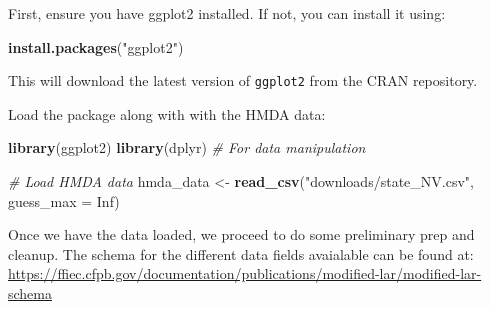 \documentclass[
]{book}
\newenvironment{Shaded}{\begin{snugshade}}{\end{snugshade}}
\newcommand{\AttributeTok}[1]{\textcolor[rgb]{0.13,0.29,0.53}{#1}}
\newcommand{\CommentTok}[1]{\textcolor[rgb]{0.56,0.35,0.01}{\textit{#1}}}
\newcommand{\ConstantTok}[1]{\textcolor[rgb]{0.56,0.35,0.01}{#1}}
\newcommand{\FunctionTok}[1]{\textcolor[rgb]{0.13,0.29,0.53}{\textbf{#1}}}
\newcommand{\NormalTok}[1]{#1}
\newcommand{\OtherTok}[1]{\textcolor[rgb]{0.56,0.35,0.01}{#1}}
\newcommand{\StringTok}[1]{\textcolor[rgb]{0.31,0.60,0.02}{#1}}
\begin{document}
First, ensure you have ggplot2 installed. If not, you can install it using:

\begin{Shaded}
\begin{Highlighting}[]
\FunctionTok{install.packages}\NormalTok{(}\StringTok{"ggplot2"}\NormalTok{)}
\end{Highlighting}
\end{Shaded}

This will download the latest version of \texttt{ggplot2} from the CRAN repository.

Load the package along with with the HMDA data:

\begin{Shaded}
\begin{Highlighting}[]
\FunctionTok{library}\NormalTok{(ggplot2)}
\FunctionTok{library}\NormalTok{(dplyr)  }\CommentTok{\# For data manipulation}

\CommentTok{\# Load HMDA data}
\NormalTok{hmda\_data }\OtherTok{\textless{}{-}} \FunctionTok{read\_csv}\NormalTok{(}\StringTok{"downloads/state\_NV.csv"}\NormalTok{, }\AttributeTok{guess\_max =} \ConstantTok{Inf}\NormalTok{)}
\end{Highlighting}
\end{Shaded}

Once we have the data loaded, we proceed to do some preliminary prep and cleanup. The schema for the different data fields avaialable can be found at: \url{https://ffiec.cfpb.gov/documentation/publications/modified-lar/modified-lar-schema}
\end{document}

